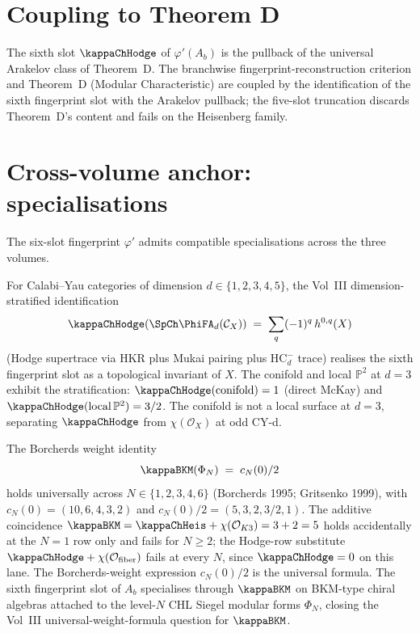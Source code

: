 \section{Coupling to Theorem D}
\label{sec:fingerprint-theoremD-coupling}

\begin{remark}
\label{rem:fingerprint-theoremD-coupling}
The sixth slot $\kappaChHodge$ of $\varphi'(A_b)$ is the pullback of
the universal Arakelov class of Theorem~D. The branchwise
fingerprint-reconstruction criterion and Theorem~D (Modular
Characteristic) are coupled by the identification of the sixth
fingerprint slot with the Arakelov pullback; the five-slot truncation
discards Theorem~D's content and fails on the Heisenberg family.
\end{remark}

\section{Cross-volume anchor: specialisations}
\label{sec:fingerprint-anchor}

The six-slot fingerprint $\varphi'$ admits compatible specialisations
across the three volumes.

\begin{remark}
\label{rem:fingerprint-cy-d-stratification}
For Calabi--Yau categories of dimension $d \in \{1, 2, 3, 4, 5\}$, the
Vol~III dimension-stratified identification
\[
 \kappaChHodge(\SpCh \PhiFA_d(\mathcal{C}_X))
 \;=\;
 \sum_{q} (-1)^{q}\, h^{0,q}(X)
\]
(Hodge supertrace via HKR plus Mukai pairing plus $\mathrm{HC}^{-}_{d}$
trace) realises the sixth fingerprint slot as a topological invariant
of $X$. The conifold and local $\mathbb{P}^{2}$ at $d = 3$ exhibit the
stratification: $\kappaChHodge(\mathrm{conifold}) = 1$ (direct McKay)
and $\kappaChHodge(\mathrm{local}\,\mathbb{P}^{2}) = 3/2$. The conifold
is not a local surface at $d = 3$, separating $\kappaChHodge$ from
$\chi(\mathcal{O}_X)$ at odd CY-d.
\end{remark}

\begin{remark}
\label{rem:fingerprint-bkm-universal}
The Borcherds weight identity
\[
 \kappaBKM(\Phi_{N}) \;=\; c_{N}(0)/2
\]
holds universally across $N \in \{1, 2, 3, 4, 6\}$ (Borcherds 1995;
Gritsenko 1999), with $c_N(0) = (10, 6, 4, 3, 2)$ and
$c_N(0)/2 = (5, 3, 2, 3/2, 1)$. The additive coincidence
$\kappaBKM = \kappaChHeis + \chi(\mathcal{O}_{K3}) = 3 + 2 = 5$ holds
accidentally at the $N = 1$ row only and fails for $N \ge 2$; the
Hodge-row substitute $\kappaChHodge + \chi(\mathcal{O}_{\mathrm{fiber}})$
fails at every $N$, since $\kappaChHodge = 0$ on this lane. The
Borcherds-weight expression $c_N(0)/2$ is the universal
formula. The sixth fingerprint slot of $A_b$ specialises through
$\kappaBKM$ on BKM-type chiral algebras attached to the level-$N$
CHL Siegel modular forms $\Phi_N$, closing the Vol~III
universal-weight-formula question for $\kappaBKM$.
\end{remark}

